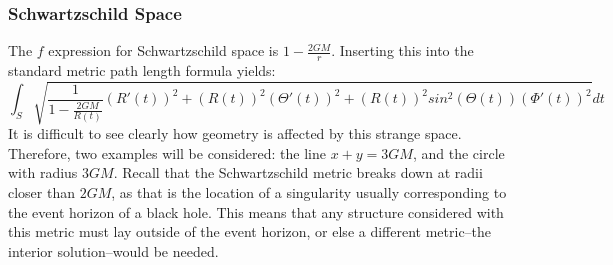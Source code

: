 \documentclass{article}
\begin{document}
\subsubsection{Schwartzschild Space}
The $f$ expression for Schwartzschild space is $1-\frac{2GM}{r}$. Inserting this into the standard metric path length formula yields:
\[
\int_S \sqrt{\frac{1}{1-\frac{2GM}{R(t)}}(R'(t))^2 + (R(t))^2 (\Theta'(t))^2 + (R(t))^2 sin^2(\Theta(t))(\Phi'(t))^2} dt
\]
It is difficult to see clearly how geometry is affected by this strange space. Therefore, two examples will be considered: the line $x+y=3GM$, and the circle with radius $3GM$. Recall that the Schwartzschild metric breaks down at radii closer than $2GM$, as that is the location of a singularity usually corresponding to the event horizon of a black hole. This means that any structure considered with this metric must lay outside of the event horizon, or else a different metric--the interior solution--would be needed.
\end{document}
